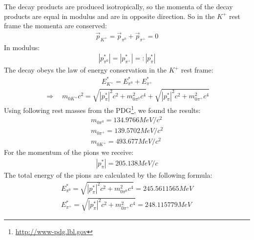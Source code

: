 \documentclass[a4paper,parskip,11pt, DIV12]{scrreprt}
\begin{document}
	The decay products are produced isotropically, so the momenta of the decay products are equal in modulus and are in opposite direction. 
	So in the $K^+$ rest frame the momenta are conserved:
	\begin{align*}
	\overrightarrow{p}_{K^+} = \overrightarrow{p}_{\pi^0} + \overrightarrow{p}_{\pi^+} = 0
	\end{align*}
	In modulus:
	\begin{align*}
	|p^*_{\pi^0}| = |p^*_{\pi^+}| =: |p^*_{\pi}|
	\end{align*}	
	The decay obeys the law of energy conservation in the $K^+$ rest frame:
	\begin{align*}
	E^*_{K^+} = E^*_{\pi^0} + E^*_{\pi^+}
	\end{align*}
	\begin{align*}
	\Rightarrow \quad	m_{0K^+}c^2 = \sqrt{|p^*_{\pi}|^2c^2 + m_{0\pi^0}^2c^4} + \sqrt{|p^*_{\pi}|^2c^2 + m_{0\pi^+}^2c^4}
	\end{align*}	
	Using following rest masses from the PDG\footnote{\url{http://www-pdg.lbl.gov}}, we found the results:
	\begin{align*}
	m_{0\pi^0} = 134.9766 MeV/c^2\\
	m_{0\pi^+} = 139.5702 MeV/c^2\\
	m_{0K^+} = 493.677 MeV/c^2
	\end{align*}
	For the momentum of the pions we receive:	
	\begin{align*}
	|p^*_{\pi}| = 205.138 MeV/c
	\end{align*}	
	The total energy of the pions are calculated by the following formula:
	\begin{align*}
	E_{\pi^0}^* = \sqrt{|p^*_{\pi}|^2c^2 + m_{0\pi^0}^2c^4} = 245.5611565 MeV\\
	E_{\pi^+}^* = \sqrt{|p^*_{\pi}|^2c^2 + m_{0\pi^+}^2c^4}= 248.115779 MeV
	\end{align*}
	
	
	\clearpage  
	
	
\end{document}
